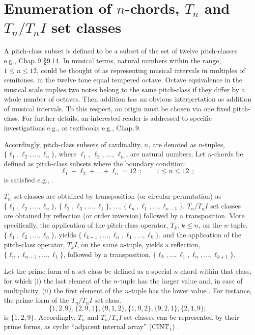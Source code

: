 \documentclass[12pt,a4paper]{article}
\begin{document}
\section{Enumeration of $n$-chords, $T_n$ and $T_n/T_nI$ set classes}
\label{como}

A pitch-class subset is defined to be a subset of the set of twelve
pitch-classes e.g., \cite{Ben06}
Chap.\,9 \S9.14.   In musical terms, natural numbers within the range,
$1\le n\le12$, could be thought of as
representing musical intervals in multiples of semitones, in the twelve tone
equal tempered octave.   Octave equivalence in the musical scale implies two
notes belong to the same pitch-class if they differ by a whole number of
octaves.
Then addition has an obvious interpretation as addition of musical intervals.
To this respect, an origin must be chosen via one fixed pitch-class.  For
further details, an interested reader is addressed to specific investigations
e.g., \cite{Fri99} or textbooks e.g., \cite{Ben06} Chap.\,9.

Accordingly, pitch-class subsets of cardinality, $n$, are denoted as
$n$-tuples, $\{\ell_1,\ell_2,...,\ell_n\}$, where
$\ell_1$, $\ell_2$, ..., $\ell_n$, are natural numbers.   Let $n$-chords be
defined as pitch-class subsets where the boundary condition:
\begin{equation}
\label{eq:boco}
\ell_1+\ell_2+...+\ell_n=12~~;\qquad1\le n\le12~~;
\end{equation}
is satisfied e.g., \cite{Fri99}.

$T_n$ set classes are obtained by transposition (or circular permutation) as
$\{\ell_1,\ell_2,...,\ell_n\}$, $\{\ell_2,\ell_3,...,\ell_1\}$, ...,
$\{\ell_n,\ell_1,...,\ell_{n-1}\}$.   $T_n/T_nI$ set classes are obtained by
reflection (or order inversion) followed by a transposition.   More
specifically, the application of the pitch-class operator, $T_k$, $k\le n$,
on the $n$-tuple, $\{\ell_1,\ell_2,...,\ell_n\}$, yields
$\{\ell_{k+1},...,\ell_n,\ell_1,...,\ell_k\}$, and the application of the
pitch-class operator, $T_kI$, on the same $n$-tuple, yields a reflection,
$\{\ell_n,\ell_{n-1},...,\ell_1\}$, followed by a transposition,
$\{\ell_k,...,\ell_1,\ell_n,...,\ell_{k+1}\}$.

Let the prime form of a set class be defined as a special $n$-chord within
that
class, for which (i) the last element of the $n$-tuple has the larger value
and, in case of multiplicity, (ii) the first element of the $n$-tuple has the
lower value \cite{Cri79}.   For instance, the prime form of the $T_n/T_nI$ set
class,
\begin{displaymath}
\{1,2,9\},\{2,9,1\},\{9,1,2\},\{1,9,2\},\{9,2,1\},\{2,1,9\};
\end{displaymath}
is $\{1,2,9\}$.   Accordingly, $T_n$ and $T_n/T_nI$ set
classes can be
represented by their prime forms, as cyclic ``adjacent internal array''
(CINT$_1$) \cite{Cri79}.
\end{document}
